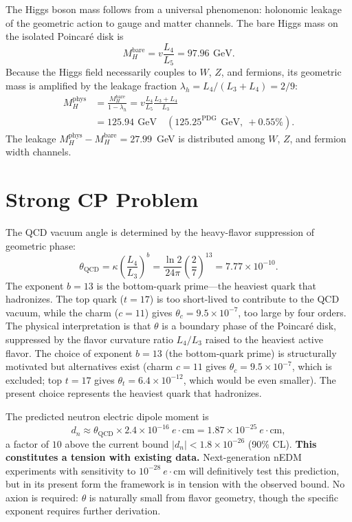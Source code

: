 \documentclass[aps,prd,reprint,twocolumn,showpacs,superscriptaddress]{revtex4-2}
\newcommand{\gev}{\,\text{GeV}}
\newcommand{\PDG}[1]{\ensuremath{#1^{\text{PDG}}}}
\begin{document}
The Higgs boson mass follows from a universal phenomenon:
holonomic leakage of the geometric action to gauge and matter
channels.  The bare Higgs mass on the isolated Poincar\'{e} disk is
\begin{equation}
M_H^{\text{bare}} = v \frac{L_4}{L_5} = 97.96\ \gev.
\end{equation}
Because the Higgs field necessarily couples to $W$, $Z$, and fermions,
its geometric mass is amplified by the leakage fraction
$\lambda_h = L_4/(L_3+L_4) = 2/9$:
\begin{align}
M_H^{\text{phys}} &= \frac{M_H^{\text{bare}}}{1 - \lambda_h}
                  = v \frac{L_4}{L_5} \frac{L_3 + L_4}{L_3} \\
                &= 125.94\ \gev
                \quad (\PDG{125.25}\ \gev,\ +0.55\%).
\end{align}
The leakage $M_H^{\text{phys}} - M_H^{\text{bare}} = 27.99$~GeV is
distributed among $W$, $Z$, and fermion width channels.

\section{Strong CP Problem}
\label{sec:strongcp}

The QCD vacuum angle is determined by the
heavy-flavor suppression of geometric phase:
\begin{equation}
\theta_{\text{QCD}} = \kappa \left(\frac{L_4}{L_3}\right)^b
                    = \frac{\ln 2}{24\pi} \left(\frac{2}{7}\right)^{13}
                    = 7.77 \times 10^{-10}.
\end{equation}
The exponent $b = 13$ is the bottom-quark prime---the heaviest quark
that hadronizes.  The top quark ($t = 17$) is too short-lived to
contribute to the QCD vacuum, while the charm ($c = 11$) gives
$\theta_c = 9.5 \times 10^{-7}$, too large by four orders.
The physical interpretation is that $\theta$ is a boundary phase
of the Poincar\'{e} disk, suppressed by the flavor curvature ratio
$L_4/L_3$ raised to the heaviest active flavor.  The choice of exponent
$b = 13$ (the bottom-quark prime) is structurally motivated but
alternatives exist (charm $c = 11$ gives $\theta_c = 9.5 \times 10^{-7}$,
which is excluded; top $t = 17$ gives $\theta_t = 6.4 \times 10^{-12}$,
which would be even smaller).  The present choice represents the
heaviest quark that hadronizes.

The predicted neutron electric dipole moment is
\begin{equation}
d_n \approx \theta_{\text{QCD}} \times 2.4 \times 10^{-16}\ e\cdot\text{cm}
      = 1.87 \times 10^{-25}\ e\cdot\text{cm},
\end{equation}
a factor of $10$ above the current bound $|d_n| < 1.8 \times 10^{-26}$
(90\% CL).  \textbf{This constitutes a tension with existing data.}
Next-generation nEDM experiments with sensitivity to
$10^{-28}\ e\cdot\text{cm}$ will definitively test this prediction,
but in its present form the framework is in tension with the observed
bound.  No axion is required: $\theta$ is naturally small from flavor
geometry, though the specific exponent requires further derivation.
\end{document}
